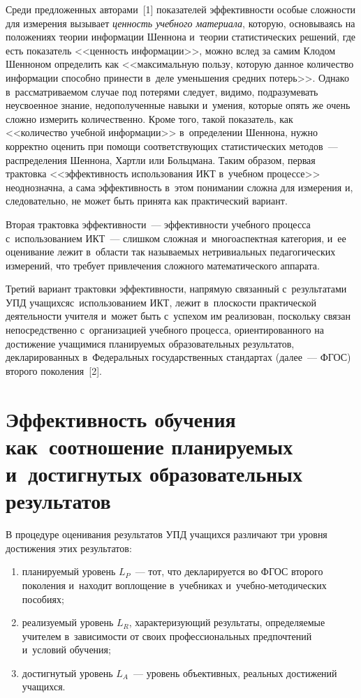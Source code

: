 \begin{multicols}{2}
   Среди предложенных авторами~[1] показателей эффективности особые сложности для
измерения вызывает \textit{ценность учебного материала}, которую, основываясь на
положениях теории информации Шеннона и~теории статистических решений, где есть
показатель <<ценность информации>>, можно вслед за самим Клодом Шенноном определить
как <<максимальную пользу, которую данное количество
информации способно принести в~деле уменьшения средних потерь>>.
Однако в~рас\-смат\-ри\-ва\-емом случае под потерями следует,
видимо, подразумевать неусвоенное знание, недополученные навыки и~умения, которые опять
же очень сложно измерить количественно. Кроме того, такой показатель, как <<количество
учебной информации>> в~определении Шеннона, нужно корректно оценить при помощи
соответствующих статистических методов~--- распределения Шеннона, Хартли или Больцмана.
Таким образом, первая трактовка <<эффективность использования ИКТ в~учебном процессе>>
неоднозначна, а сама эффективность в~этом понимании сложна для измерения и, следовательно,
не может быть принята как практический вариант.

   Вторая трактовка эффективности~--- эффективности учебного процесса с~использованием
ИКТ~--- слишком сложная и~многоаспектная категория, и~ее оценивание лежит в~области так
называемых нетривиальных педагогических измерений, что требует привлечения сложного
математического аппарата.

   Третий вариант трактовки эффективности, напрямую связанный с~результатами УПД
учащихся\linebreak с~использованием ИКТ, лежит в~плоскости прак\-тической
деятельности учителя и~может быть \mbox{с~успехом} им реализован, поскольку связан непосредственно с~организацией
учебного процесса, ориентированного на достижение учащимися планируемых
образовательных результатов, декларированных в~Федеральных государственных
стандартах  (далее~--- ФГОС) второго поколения~[2].

\section{Эффективность обучения как~соотношение планируемых
и~достигнутых образовательных результатов}

  В процедуре оценивания результатов УПД учащихся различают три уровня достижения этих
результатов:
  \begin{enumerate}[(1)]
\item планируемый уровень $L_P$~--- тот, что декларируется во ФГОС второго поколения и~находит воплощение в~учебниках и~учеб\-но-ме\-то\-ди\-че\-ских пособиях;
\item реализуемый уровень $L_R$, характеризующий результаты, определяемые учителем
в~зави\-си\-мости от своих профессиональных предпочтений и~условий обучения;
\item достигнутый уровень $L_A$~--- уровень объективных, реальных достижений учащихся.
\end{enumerate}


\end{multicols}
